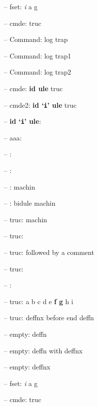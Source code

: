 \documentclass{book}
\begin{document}
\begin{titlepage}
\hbox{}-- fset: \emph{i} a g


%
%
\hbox{}-- cmde: truc 


%
\hbox{}-- Command: log trap 


%
\hbox{}-- Command: log trap1 


%
\hbox{}-- Command: log trap2 


%
\hbox{}-- cmde: \textbf{id ule} truc


%
\hbox{}-- cmde2: \textbf{id `\texttt{i}' ule} truc


%
\hbox{}-- \textbf{id `\texttt{i}' ule}: 



\hbox{}-- aaa: 


\hbox{}-- : 


\hbox{}-- : 


\hbox{}-- : machin


%
\hbox{}-- : bidule machin


%
\hbox{}-- truc: machin


%
\hbox{}-- truc: 


\hbox{}-- truc: followed by a comment


%
\hbox{}-- truc: 


\hbox{}-- : 


\hbox{}-- truc: a b c d e \textbf{f g} h i


%
\hbox{}-- truc: deffnx before end deffn


%

\hbox{}-- empty: deffn


%

\hbox{}-- empty: deffn with deffnx


%
\hbox{}-- empty: deffnx


%

\hbox{}-- fset: \emph{i} a g


%
\hbox{}-- cmde: truc 



\end{titlepage}
\end{document}
